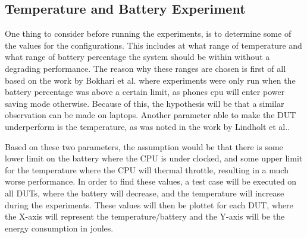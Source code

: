 \subsection{Temperature and Battery Experiment}

One thing to consider before running the experiments, is to determine some of the values for the configurations. This includes at what range of temperature and what range of battery percentage the system should be within without a degrading performance. The reason why these ranges are chosen is first of all based on the work by Bokhari et al.\cite*[]{Bokhari2020r3} where experiments were only run when the battery percentage was above a certain limit, as phones cpu will enter power saving mode otherwise. Because of this, the hypothesis will be that a similar observation can be made on laptops. Another parameter able to make the DUT underperform is the temperature, as was noted in the work by Lindholt et al.\cite*[]{Lindholt2022}. 

Based on these two parameters, the assumption would be that there is some lower limit on the battery where the CPU is under clocked, and some upper limit for the temperature where the CPU will thermal throttle, resulting in a much worse performance. In order to find these values, a test case will be executed on all DUTs, where the battery will decrease, and the temperature will increase during the experiments. These values will then be plottet for each DUT, where the X-axis will represent the temperature/battery and the Y-axis will be the energy consumption in joules.